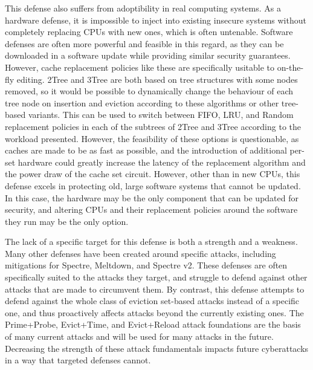 \documentclass[letterpaper]{article}
\begin{document}
This defense also suffers from adoptibility in real computing systems.
As a hardware defense, it is impossible to inject into existing insecure systems
without completely replacing CPUs with new ones, which is often untenable.
Software defenses are often more powerful and feasible in this regard,
as they can be downloaded in a software update while providing similar security guarantees.
However, cache replacement policies like these are specifically usitable to on-the-fly editing.
2Tree and 3Tree are both based on tree structures with some nodes removed,
so it would be possible to dynamically change the behaviour of each tree node
on insertion and eviction according to these algorithms or other tree-based variants.
This can be used to switch between FIFO, LRU, and Random replacement policies
in each of the subtrees of 2Tree and 3Tree according to the workload presented.
However, the feasibility of these options is questionable,
as caches are made to be as fast as possible,
and the introduction of additional per-set hardware
could greatly increase the latency of the replacement algorithm
and the power draw of the cache set circuit.
However, other than in new CPUs, this defense excels in protecting old, large software systems
that cannot be updated.
In this case, the hardware may be the only component that can be updated for security,
and altering CPUs and their replacement policies around the software they run
may be the only option.

The lack of a specific target for this defense is both a strength and a weakness.
Many other defenses have been created around specific attacks,
including mitigations for Spectre, Meltdown, and Spectre v2.
These defenses are often specifically suited to the attacks they target,
and struggle to defend against other attacks that are made to circumvent them.
By contrast, this defense attempts to defend against the whole class of
eviction set-based attacks instead of a specific one,
and thus proactively affects attacks beyond the currently existing ones.
The Prime+Probe, Evict+Time, and Evict+Reload attack foundations
are the basis of many current attacks and will be used for many attacks in the future.
Decreasing the strength of these attack fundamentals impacts
future cyberattacks in a way that targeted defenses cannot.
\end{document}
